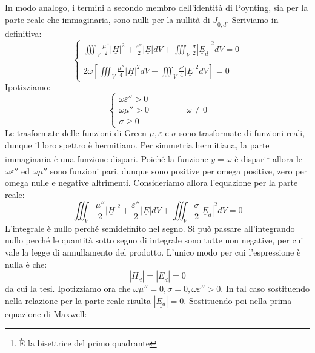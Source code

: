 \documentclass{book}
\begin{document}
         In modo analogo, i termini a secondo membro dell'identità di Poynting, sia per la parte reale che immaginaria, sono nulli per la nullità di $\underline{J}_{0, d}$. Scriviamo in definitiva:
         \begin{equation}
             \begin{cases}
                 \displaystyle \iiint_{V}\frac{\mu''}{2}|\underline{H}|^{2}+\frac{\varepsilon''}{2}|\underline{E}|dV+\iiint_{V} \frac{\sigma}{2}|\underline{E}_{d}|^{2}dV = 0 \\ \\

                \displaystyle 2 \omega [\iiint_{V} \frac{\mu''}{4}|\underline{H}|^{2}dV - \iiint_{V} \frac{\varepsilon'}{4}|\underline{E}|^{2}dV]= 0
             \end{cases}
         \end{equation}
Ipotizziamo:
\begin{equation}
    \begin{cases}
        \omega \varepsilon''>0 \\
        \omega \mu'' > 0 \\
        \sigma \geq 0
    \end{cases} \qquad \qquad \omega \neq 0
\end{equation}
Le trasformate delle funzioni di Green $\mu, \varepsilon$ e $\sigma$ sono trasformate di funzioni reali, dunque il loro spettro è hermitiano. Per simmetria hermitiana, la parte immaginaria è una funzione dispari. Poiché la funzione $y=\omega$ è dispari\footnote{È la bisettrice del primo quadrante} allora le $\omega \varepsilon''$ ed $\omega \mu''$ sono funzioni pari, dunque sono positive per omega positive, zero per omega nulle e negative altrimenti. Consideriamo allora l'equazione per la parte reale:
\begin{equation}
    \iiint_{V}\frac{\mu''}{2}|\underline{H}|^{2}+\frac{\varepsilon''}{2}|\underline{E}|dV+\iiint_{V} \frac{\sigma}{2}|\underline{E}_{d}|^{2}dV = 0
\end{equation}
L'integrale  è nullo perché semidefinito nel segno. Si può passare all'integrando nullo perché le quantità sotto segno di integrale sono tutte non negative, per cui vale la legge di annullamento del prodotto. L'unico modo per cui l'espressione è nulla è che:
\begin{equation}
    |\underline{H}_{d}|=|\underline{E}_{d}|=0
\end{equation}
da cui la tesi.
Ipotizziamo ora che $\omega \mu'' = 0, \sigma =0, \omega \varepsilon''>0$. In tal caso sostituendo nella relazione per la parte reale risulta $|\underline{E_{d}}|=0$. Sostituendo poi nella prima equazione di Maxwell:
\end{document}
